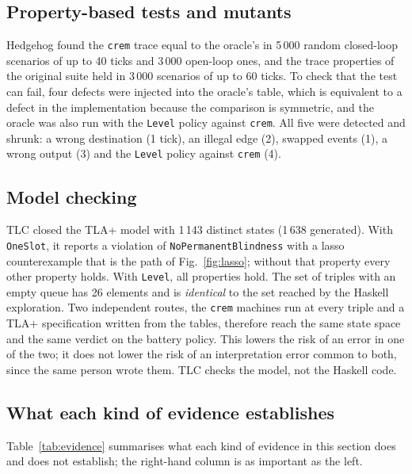 \documentclass[review]{jfp-epi}
\newcommand{\crem}{\texttt{crem}}
\newcommand{\code}[1]{\texttt{#1}}
\begin{document}
\subsection{Property-based tests and mutants}

Hedgehog found the \crem{} trace equal to the oracle's in 5\,000 random closed-loop scenarios of up to 40 ticks and 3\,000 open-loop ones, and the trace properties of the original suite held in 3\,000 scenarios of up to 60 ticks. To check that the test can fail, four defects were injected into the oracle's table, which is equivalent to a defect in the implementation because the comparison is symmetric, and the oracle was also run with the \code{Level} policy against \crem{}. All five were detected and shrunk: a wrong destination (1 tick), an illegal edge (2), swapped events (1), a wrong output (3) and the \code{Level} policy against \crem{} (4).

\subsection{Model checking}

TLC closed the TLA+ model with 1\,143 distinct states (1\,638 generated). With \code{OneSlot}, it reports a violation of \code{NoPermanentBlindness} with a lasso counterexample that is the path of Fig.~\ref{fig:lasso}; without that property every other property holds. With \code{Level}, all properties hold. The set of triples with an empty queue has 26 elements and is \emph{identical} to the set reached by the Haskell exploration. Two independent routes, the \crem{} machines run at every triple and a TLA+ specification written from the tables, therefore reach the same state space and the same verdict on the battery policy. This lowers the risk of an error in one of the two; it does not lower the risk of an interpretation error common to both, since the same person wrote them. TLC checks the model, not the Haskell code.

\subsection{What each kind of evidence establishes}

Table~\ref{tab:evidence} summarises what each kind of evidence in this section does and does not establish; the right-hand column is as important as the left.
\end{document}
